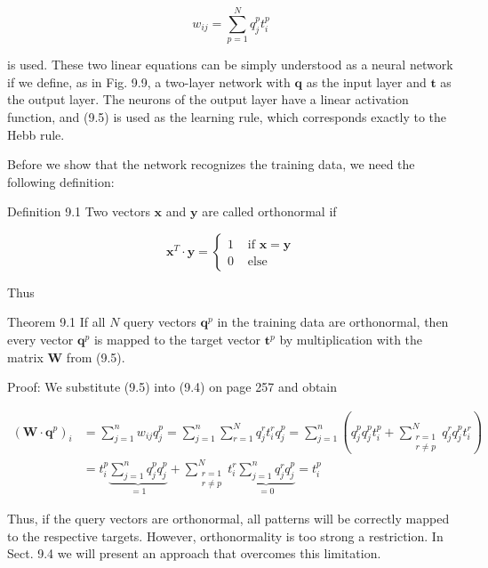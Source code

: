 \documentclass[10pt]{book}
\begin{document}
\begin{equation*}
w_{i j}=\sum_{p=1}^{N} q_{j}^{p} t_{i}^{p} \tag{9.5}
\end{equation*}


is used. These two linear equations can be simply understood as a neural network if we define, as in Fig. 9.9, a two-layer network with $\boldsymbol{q}$ as the input layer and $\boldsymbol{t}$ as the output layer. The neurons of the output layer have a linear activation function, and (9.5) is used as the learning rule, which corresponds exactly to the Hebb rule.

Before we show that the network recognizes the training data, we need the following definition:

Definition 9.1 Two vectors $\boldsymbol{x}$ and $\boldsymbol{y}$ are called orthonormal if

$$
\boldsymbol{x}^{T} \cdot \boldsymbol{y}= \begin{cases}1 & \text { if } \boldsymbol{x}=\boldsymbol{y} \\ 0 & \text { else }\end{cases}
$$

Thus

Theorem 9.1 If all $N$ query vectors $\boldsymbol{q}^{p}$ in the training data are orthonormal, then every vector $\boldsymbol{q}^{p}$ is mapped to the target vector $\boldsymbol{t}^{p}$ by multiplication with the matrix $\boldsymbol{W}$ from (9.5).

Proof: We substitute (9.5) into (9.4) on page 257 and obtain

$$
\begin{aligned}
\left(\boldsymbol{W} \cdot \boldsymbol{q}^{p}\right)_{i} & =\sum_{j=1}^{n} w_{i j} q_{j}^{p}=\sum_{j=1}^{n} \sum_{r=1}^{N} q_{j}^{r} t_{i}^{r} q_{j}^{p}=\sum_{j=1}^{n}\left(q_{j}^{p} q_{j}^{p} t_{i}^{p}+\sum_{\substack{r=1 \\
r \neq p}}^{N} q_{j}^{r} q_{j}^{p} t_{i}^{r}\right) \\
& =t_{i}^{p} \underbrace{\sum_{j=1}^{n} q_{j}^{p} q_{j}^{p}}_{=1}+\sum_{\substack{r=1 \\
r \neq p}}^{N} t_{i}^{r} \underbrace{\sum_{j=1}^{n} q_{j}^{r} q_{j}^{p}}_{=0}=t_{i}^{p}
\end{aligned}
$$

Thus, if the query vectors are orthonormal, all patterns will be correctly mapped to the respective targets. However, orthonormality is too strong a restriction. In Sect. 9.4 we will present an approach that overcomes this limitation.
\end{document}
